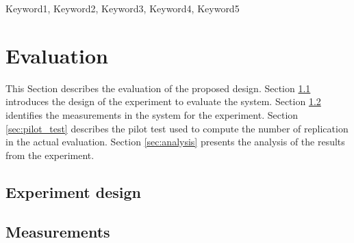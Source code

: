 \documentclass[conference]{IEEEtran}
\begin{document}
\maketitle
\IEEEpubidadjcol
\begin{abstract}





\end{abstract}

\begin{IEEEkeywords}
    Keyword1, Keyword2, Keyword3, Keyword4, Keyword5
\end{IEEEkeywords}



\vspace{1cm}



\vspace{1cm}



\vspace{1cm}


\vspace{1cm}


\section{Evaluation}
\label{sec:evaluation}
This Section describes the evaluation of the proposed design.
Section \ref{sec:design} introduces the design of the experiment to evaluate the system.
Section \ref{sec:measurements} identifies the measurements in the system for the experiment.
Section \ref{sec:pilot_test} describes the pilot test used to compute the number of replication in the actual evaluation.
Section \ref{sec:analysis} presents the analysis of the results from the experiment.


\subsection{Experiment design}
\label{sec:design}


\subsection{Measurements}
\label{sec:measurements}
\end{document}
